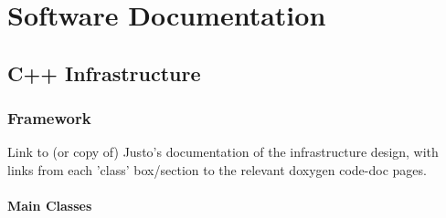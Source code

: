 \section{Software Documentation}

\subsection{C++ Infrastructure}

\subsubsection{Framework}
{\green Link to (or copy of) Justo's documentation of the infrastructure design, 
with links from each 'class' box/section to the relevant doxygen code-doc pages. }

\paragraph{Main Classes}

